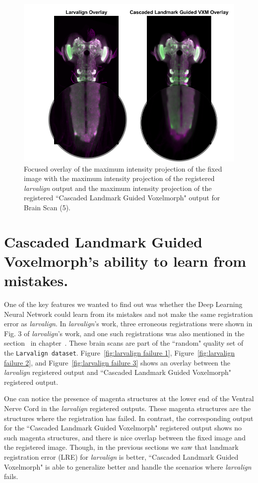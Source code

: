 \documentclass{book}
\begin{document}
	\begin{figure}[h!]
		\centering
		\includegraphics[width=0.7\columnwidth]{resources/chapter7/LRE_Visual/14c08c_overlay_zoomed.png}
		\caption{Focused overlay of the maximum intensity projection of the fixed image with the maximum intensity projection of the registered \textit{larvalign} output and the maximum intensity projection of the registered ``Cascaded Landmark Guided Voxelmorph" output for Brain Scan (5).}
		\label{fig:14c08c_overlay}
	\end{figure}
	
	\newpage
	\section{Cascaded Landmark Guided Voxelmorph's ability to learn from mistakes.}
	One of the key features we wanted to find out was whether the Deep Learning Neural Network could learn from its mistakes and not make the same registration error as \textit{larvalign}. In \emph{larvalign}'s work, three erroneous registrations were shown in Fig. 3 of \textit{larvalign}'s work, and one such registrations was also mentioned in the section~ in chapter~. These brain scans are part of the ``random" quality set of the \texttt{Larvalign dataset}. Figure~\ref{fig:larvalign failure 1}, Figure~\ref{fig:larvalign failure 2}, and Figure~\ref{fig:larvalign failure 3} shows an overlay between the \textit{larvalign} registered output and ``Cascaded Landmark Guided Voxelmorph" registered output.
	
	One can notice the presence of magenta structures at the lower end of the Ventral Nerve Cord in the \textit{larvalign} registered outputs. These magenta structures are the structures where the registration has failed. In contrast, the corresponding output for the ``Cascaded Landmark Guided Voxelmorph" registered output shows no such magenta structures, and there is nice overlap between the fixed image and the registered image. Though, in the previous sections we saw that landmark registration error (LRE) for \textit{larvalign} is better, ``Cascaded Landmark Guided Voxelmorph" is able to generalize better and handle the scenarios where \textit{larvalign} fails.
	
\end{document}
